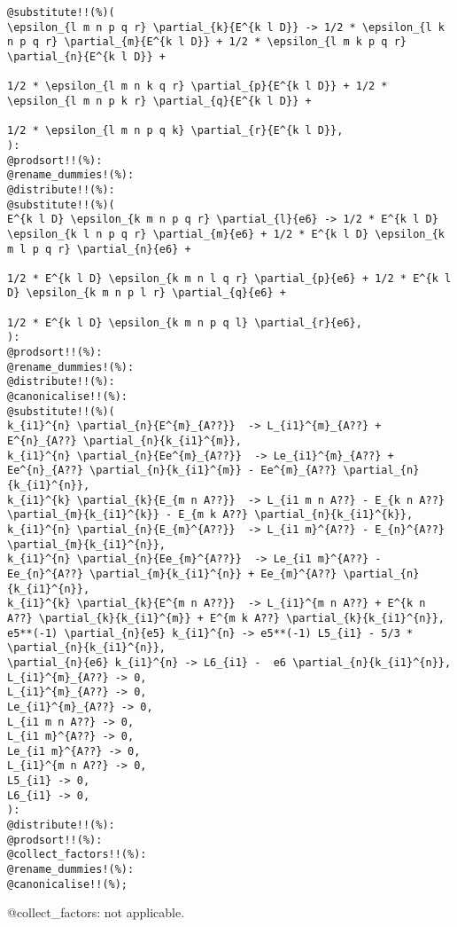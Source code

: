 \documentclass[11pt]{article}
\begin{document}
{\color[named]{Blue}\begin{verbatim}
@substitute!!(%)(
\epsilon_{l m n p q r} \partial_{k}{E^{k l D}} -> 1/2 * \epsilon_{l k n p q r} \partial_{m}{E^{k l D}} + 1/2 * \epsilon_{l m k p q r} \partial_{n}{E^{k l D}} + 
                                                                               1/2 * \epsilon_{l m n k q r} \partial_{p}{E^{k l D}} + 1/2 * \epsilon_{l m n p k r} \partial_{q}{E^{k l D}} +
                                                                               1/2 * \epsilon_{l m n p q k} \partial_{r}{E^{k l D}},
):
@prodsort!!(%):
@rename_dummies!(%):
@distribute!!(%):
@substitute!!(%)(
E^{k l D} \epsilon_{k m n p q r} \partial_{l}{e6} -> 1/2 * E^{k l D} \epsilon_{k l n p q r} \partial_{m}{e6} + 1/2 * E^{k l D} \epsilon_{k m l p q r} \partial_{n}{e6} + 
                                                                               1/2 * E^{k l D} \epsilon_{k m n l q r} \partial_{p}{e6} + 1/2 * E^{k l D} \epsilon_{k m n p l r} \partial_{q}{e6} +
                                                                               1/2 * E^{k l D} \epsilon_{k m n p q l} \partial_{r}{e6},
):
@prodsort!!(%):
@rename_dummies!(%):
@distribute!!(%):
@canonicalise!!(%):
@substitute!!(%)(
k_{i1}^{n} \partial_{n}{E^{m}_{A??}}  -> L_{i1}^{m}_{A??} + E^{n}_{A??} \partial_{n}{k_{i1}^{m}},
k_{i1}^{n} \partial_{n}{Ee^{m}_{A??}}  -> Le_{i1}^{m}_{A??} + Ee^{n}_{A??} \partial_{n}{k_{i1}^{m}} - Ee^{m}_{A??} \partial_{n}{k_{i1}^{n}},
k_{i1}^{k} \partial_{k}{E_{m n A??}}  -> L_{i1 m n A??} - E_{k n A??} \partial_{m}{k_{i1}^{k}} - E_{m k A??} \partial_{n}{k_{i1}^{k}},
k_{i1}^{n} \partial_{n}{E_{m}^{A??}}  -> L_{i1 m}^{A??} - E_{n}^{A??} \partial_{m}{k_{i1}^{n}},
k_{i1}^{n} \partial_{n}{Ee_{m}^{A??}}  -> Le_{i1 m}^{A??} - Ee_{n}^{A??} \partial_{m}{k_{i1}^{n}} + Ee_{m}^{A??} \partial_{n}{k_{i1}^{n}},
k_{i1}^{k} \partial_{k}{E^{m n A??}}  -> L_{i1}^{m n A??} + E^{k n A??} \partial_{k}{k_{i1}^{m}} + E^{m k A??} \partial_{k}{k_{i1}^{n}},
e5**(-1) \partial_{n}{e5} k_{i1}^{n} -> e5**(-1) L5_{i1} - 5/3 * \partial_{n}{k_{i1}^{n}},
\partial_{n}{e6} k_{i1}^{n} -> L6_{i1} -  e6 \partial_{n}{k_{i1}^{n}},
L_{i1}^{m}_{A??} -> 0,
L_{i1}^{m}_{A??} -> 0,
Le_{i1}^{m}_{A??} -> 0,
L_{i1 m n A??} -> 0,
L_{i1 m}^{A??} -> 0,
Le_{i1 m}^{A??} -> 0,
L_{i1}^{m n A??} -> 0,
L5_{i1} -> 0,
L6_{i1} -> 0,
):
@distribute!!(%):
@prodsort!!(%):
@collect_factors!!(%):
@rename_dummies!(%):
@canonicalise!!(%);
\end{verbatim}}
@collect\_factors: not applicable.
\end{document}

